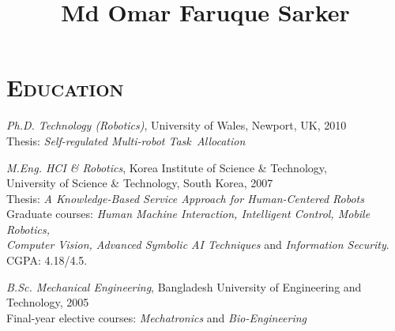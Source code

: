 \documentclass[notopicbreak,contbibnum,plain]{simplecv}
\begin{document}

%
\title{\Large Md Omar Faruque Sarker}
%
\maketitle
\vspace*{-1cm}
\section{\textsc{Education}}
\label{edu}
\begin{topic}
    \item \emph{Ph.D. Technology (Robotics)}, 
    University of Wales, Newport, UK, 2010\\
    Thesis: \textit{Self-regulated Multi-robot 				Task~Allocation}
\vspace*{-0.1cm}
    \item \emph{M.Eng. HCI \& Robotics},  
    Korea Institute of Science \& Technology,\\ University of Science \& Technology, South Korea, 2007\\ 
        Thesis: \textit{A Knowledge-Based Service Approach
for Human-Centered Robots}\\
Graduate courses: \emph{Human Machine Interaction, Intelligent Control, Mobile Robotics,\\ Computer Vision, Advanced Symbolic AI
Techniques} and \emph{Information Security}. CGPA: 4.18/4.5.
\vspace*{-0.1cm}
    \item \emph{B.Sc. Mechanical Engineering},
    Bangladesh University of Engineering and Technology, 2005\\       
Final-year elective courses: \emph{Mechatronics} and \emph{Bio-Engineering}
\end{topic}
\end{document}
